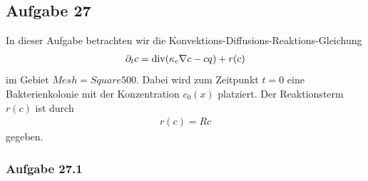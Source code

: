 
\subsection{Aufgabe 27}
In dieser Aufgabe betrachten wir die Konvektions-Diffusions-Reaktions-Gleichung
\begin{align*}
  \partial_t c = \operatorname{div} (\kappa_c \nabla c - cq) + r(c)
\end{align*}
im Gebiet $Mesh=Square500$. Dabei wird zum Zeitpunkt
$t=0$ eine Bakterienkolonie mit der Konzentration $c_0(x)$ platziert. Der Reaktionsterm $r(c)$ ist durch
\begin{align*}
  r(c) = Rc
\end{align*}
gegeben.
\subsubsection{Aufgabe 27.1}

